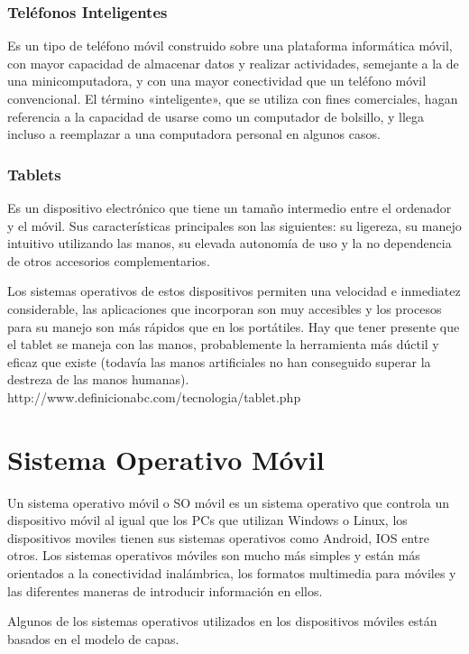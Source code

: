 \subsubsection{Teléfonos Inteligentes}
\setlength{\parskip}{5mm}
Es un tipo de teléfono móvil construido sobre una plataforma informática móvil, con mayor capacidad de almacenar datos y realizar actividades, semejante a la de una minicomputadora, y con una mayor conectividad que un teléfono móvil convencional. El término «inteligente», que se utiliza con fines comerciales, hagan referencia a la capacidad de usarse como un computador de bolsillo, y llega incluso a reemplazar a una computadora personal en algunos casos.
\setlength{\parskip}{0mm}
\subsubsection{Tablets}
\setlength{\parskip}{5mm}
Es un dispositivo electrónico que tiene un tamaño intermedio entre el ordenador y el móvil. Sus características principales son las siguientes: su ligereza, su manejo intuitivo utilizando las manos, su elevada autonomía de uso y la no dependencia de otros accesorios complementarios.

Los sistemas operativos de estos dispositivos permiten una velocidad e inmediatez considerable, las aplicaciones que incorporan son muy accesibles y los procesos para su manejo son más rápidos que en los portátiles. Hay que tener presente que el tablet se maneja con las manos, probablemente la herramienta más dúctil y eficaz que existe (todavía las manos artificiales no han conseguido superar la destreza de las manos humanas).
\setlength{\parskip}{0mm}
http://www.definicionabc.com/tecnologia/tablet.php


\section{Sistema Operativo Móvil}	
\setlength{\parskip}{5mm}
Un sistema operativo móvil o SO móvil es un sistema operativo que controla un dispositivo móvil al igual que los PCs que utilizan Windows o Linux, los dispositivos moviles tienen sus sistemas operativos como Android, IOS entre otros. Los sistemas operativos móviles son mucho más simples y están más orientados a la conectividad inalámbrica, los formatos multimedia para móviles y las diferentes maneras de introducir información en ellos.

Algunos de los sistemas operativos utilizados en los dispositivos móviles están basados en el modelo de capas.

